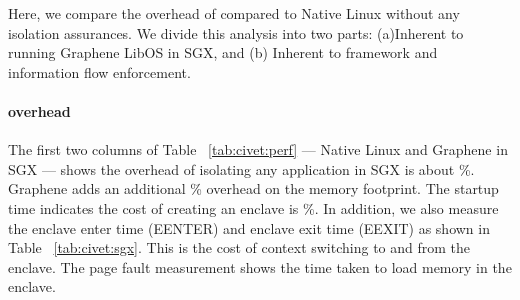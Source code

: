 %
%

Here, we compare the overhead of \sysname{} compared to Native Linux without any 
isolation assurances. We divide this analysis into two parts: (a)Inherent to running Graphene LibOS in SGX, and (b) Inherent to \sysname{} framework and information flow enforcement.

\paragraph{\sgx{} overhead}
The first two columns of Table ~\ref{tab:civet:perf} --- Native Linux and Graphene in SGX --- shows the overhead of isolating any application in SGX is about \%. Graphene adds an additional \% overhead on the memory footprint. The startup time indicates the cost of creating an enclave is \%. 
In addition, we also measure the \sgx{} enclave enter time (EENTER) and enclave exit time (EEXIT) as shown in Table ~\ref{tab:civet:sgx}. This is the cost of context switching to and from the enclave. The page fault measurement shows the time taken to load memory in the enclave.

